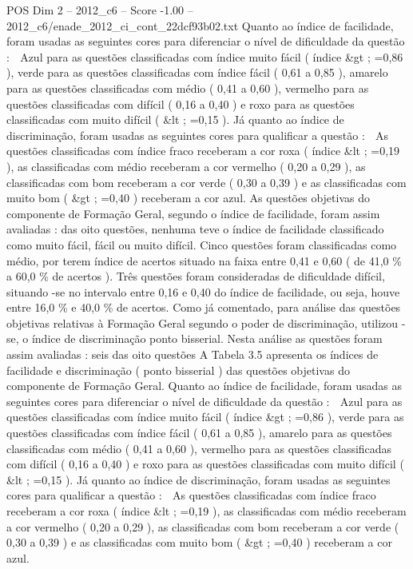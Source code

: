 \begin{textsample}{POS Dim 2 – 2012\_c6 – Score -1.00 – 2012\_c6/enade\_2012\_ci\_cont\_22dcf93b02.txt}
Quanto ao índice de facilidade, foram usadas as seguintes cores para diferenciar o nível de dificuldade da questão :  Azul para as questões classificadas com índice muito fácil ( índice \&gt ; =0,86 ), verde para as questões classificadas com índice fácil ( 0,61 a 0,85 ), amarelo para as questões classificadas com médio ( 0,41 a 0,60 ), vermelho para as questões classificadas com difícil ( 0,16 a 0,40 ) e roxo para as questões classificadas com muito difícil ( \&lt ; =0,15 ).
Já quanto ao índice de discriminação, foram usadas as seguintes cores para qualificar a questão :  As questões classificadas com índice fraco receberam a cor roxa ( índice \&lt ; =0,19 ), as classificadas com médio receberam a cor vermelho ( 0,20 a 0,29 ), as classificadas com bom receberam a cor verde ( 0,30 a 0,39 ) e as classificadas com muito bom ( \&gt ; =0,40 ) receberam a cor azul.
As questões objetivas do componente de Formação Geral, segundo o índice de facilidade, foram assim avaliadas : das oito questões, nenhuma teve o índice de facilidade classificado como muito fácil, fácil ou muito difícil.
Cinco questões foram classificadas como médio, por terem índice de acertos situado na faixa entre 0,41 e 0,60 ( de 41,0 \% a 60,0 \% de acertos ).
Três questões foram consideradas de dificuldade difícil, situando -se no intervalo entre 0,16 e 0,40 do índice de facilidade, ou seja, houve entre 16,0 \% e 40,0 \% de acertos.
Como já comentado, para análise das questões objetivas relativas à Formação Geral segundo o poder de discriminação, utilizou -se, o índice de discriminação ponto bisserial.
Nesta análise as questões foram assim avaliadas : seis das oito questões A Tabela 3.5 apresenta os índices de facilidade e discriminação ( ponto bisserial ) das questões objetivas do componente de Formação Geral.
Quanto ao índice de facilidade, foram usadas as seguintes cores para diferenciar o nível de dificuldade da questão :  Azul para as questões classificadas com índice muito fácil ( índice \&gt ; =0,86 ), verde para as questões classificadas com índice fácil ( 0,61 a 0,85 ), amarelo para as questões classificadas com médio ( 0,41 a 0,60 ), vermelho para as questões classificadas com difícil ( 0,16 a 0,40 ) e roxo para as questões classificadas com muito difícil ( \&lt ; =0,15 ).
Já quanto ao índice de discriminação, foram usadas as seguintes cores para qualificar a questão :  As questões classificadas com índice fraco receberam a cor roxa ( índice \&lt ; =0,19 ), as classificadas com médio receberam a cor vermelho ( 0,20 a 0,29 ), as classificadas com bom receberam a cor verde ( 0,30 a 0,39 ) e as classificadas com muito bom ( \&gt ; =0,40 ) receberam a cor azul.

\end{textsample}
